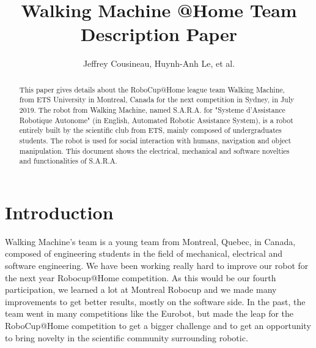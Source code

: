 \documentclass[runningheads,a4paper]{llncs}
\begin{document}
\newif\ifdraft
\draftfalse


\ifdraft
\setlength{\belowcaptionskip}{-5pt}
\fi

\title{Walking Machine @Home \newline {} Team Description Paper}

\author{Jeffrey Cousineau, Huynh-Anh Le, et al.}
\maketitle



\begin{abstract}

This paper gives details about the RoboCup@Home league team Walking Machine, from ETS University in Montreal, Canada for the next competition in Sydney, in July 2019. The robot from Walking Machine, named S.A.R.A. for "Systeme d'Assistance Robotique Autonome" (in English, Automated Robotic Assistance System), is a robot entirely built by the scientific club from ETS, mainly composed of undergraduates students. The robot is used for social interaction with humans, navigation and object manipulation. This document shows the electrical, mechanical and software novelties and functionalities of S.A.R.A.

\end{abstract}


\section{Introduction}
\tab Walking Machine’s team is a young team from Montreal, Quebec, in Canada, composed of engineering students in the field of mechanical, electrical and software engineering. We have been working really hard to improve our robot for the next year Robocup@Home competition. As this would be our fourth participation, we learned a lot at Montreal Robocup and we made many improvements to get better results, mostly on the software side. In the past, the team went in many competitions like the Eurobot, but made the leap for the RoboCup@Home competition to get a bigger challenge and to get an opportunity to bring novelty in the scientific community surrounding robotic. \\
\end{document}
